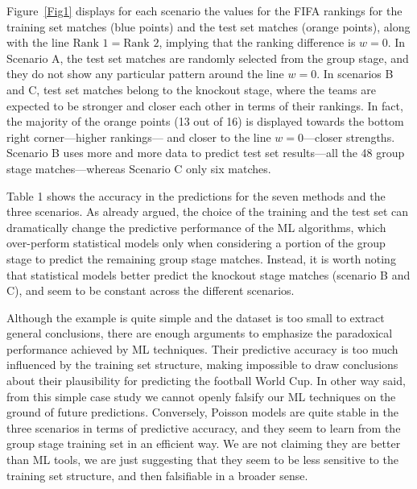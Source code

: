 \documentclass{statsoc}
\begin{document}
%
Figure~\ref{Fig1} displays for each scenario the values for the FIFA rankings for the training set matches (blue points) and the test set matches (orange points), along with the 
line $\text{Rank }1= \text{Rank }2$, implying that the ranking difference is $w=0$. In Scenario A, the test set matches are randomly selected from the group stage, and they do not 
show any particular pattern around the line $w=0$. In scenarios B and C, test set matches belong to the knockout stage, where the teams are expected to be stronger and 
closer each other in terms of their rankings. In fact, the majority of the orange points (13 out of 16) is displayed towards the bottom right corner---higher rankings--- and closer to the line $w=0$---closer strengths. Scenario B uses more and more data to predict test set results---all the 48 group stage matches---whereas Scenario C only six matches.

Table 1 shows the accuracy in the predictions for the seven methods and the three  scenarios.  As already argued, the choice of the training and the test set can dramatically 
change the predictive performance of the ML algorithms, which over-perform statistical models only when considering a portion of the group stage to predict the remaining 
group stage matches. Instead, it is worth noting that statistical models better predict the knockout stage matches (scenario B and C), and seem to be constant across the different scenarios.

Although the example is quite simple and the dataset is too small to extract general conclusions, there are enough arguments to emphasize the paradoxical performance achieved by ML techniques. Their predictive accuracy is too much influenced by the training set 
structure, making impossible to draw conclusions about their plausibility for predicting the football World Cup. In other way said, from this simple case study we cannot openly 
falsify our ML techniques on the ground of future predictions. Conversely, Poisson models are quite stable in the three scenarios in terms of predictive accuracy, and they 
seem to learn from the group stage training set in an efficient way. We are not claiming they are better than ML tools, we are just suggesting that they seem to be less sensitive to the training set structure, and then falsifiable in a broader sense.
\end{document}
